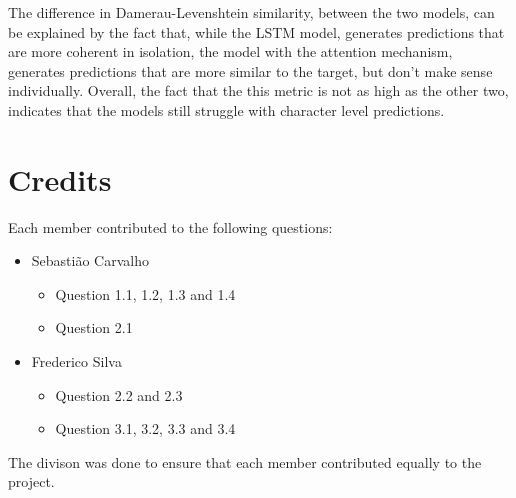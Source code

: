 \documentclass{article}
\begin{document}
The difference in Damerau-Levenshtein similarity, between the two models, can be explained by the fact that,
while the LSTM model, generates predictions that are more coherent in isolation, the model with the attention mechanism,
generates predictions that are more similar to the target, but don't make sense individually. Overall, the fact that the
this metric is not as high as the other two, indicates that the models still struggle with character level predictions.

\section{Credits}

Each member contributed to the following questions:

\begin{itemize}
    \item Sebastião Carvalho 
    \begin{itemize}
        \item Question 1.1, 1.2, 1.3 and 1.4
        \item Question 2.1
    \end{itemize}
    \item Frederico Silva
    \begin{itemize}
        \item Question 2.2 and 2.3
        \item Question 3.1, 3.2, 3.3 and 3.4
    \end{itemize}
\end{itemize}

\smallskip

The divison was done to ensure that each member contributed equally to the project.
\end{document}
